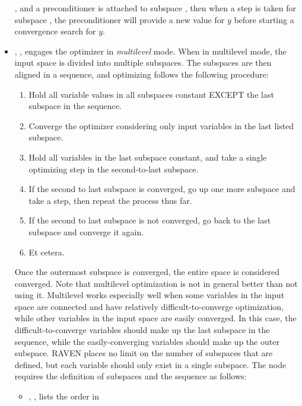 \begin{itemize}
        , and a preconditioner is attached to subspace , then when a step
        is taken for subspace , the preconditioner will provide a new value for $y$ before
        starting a convergence search for $y$.
\item {}, , engages the optimizer in \emph{multilevel}
        mode.  When in multilevel mode, the input space is divided into multiple subspaces.  The subspaces are
        then aligned in a sequence, and optimizing follows the following procedure:
        \begin{enumerate}
          \item Hold all variable values in all subspaces constant EXCEPT the last subspace in the sequence.
          \item Converge the optimizer considering only input variables in the last listed subspace.
          \item Hold all variables in the last subspace constant, and take a single optimizing step in the
            second-to-last subspace.
          \item If the second to last subspace is converged, go up one more subspace and take a step, then
            repeat the process thus far.
          \item If the second to last subspace is not converged, go back to the last subspace and converge it
            again.
          \item Et cetera.
        \end{enumerate}
        Once the outermost subspace is converged, the entire space is considered converged.
        Note that multilevel optimization is not in general better than not using it.  Multilevel works
        especially well when some variables in the input space are connected and have relatively
        difficult-to-converge optimization, while other variables in the input space are easily converged.  In
        this case, the difficult-to-converge variables should make up the last subspace in the sequence, while
        the easily-converging variables should make up the outer subspace.
        RAVEN places no limit on the
        number of subspaces that are defined, but each variable should only exist in a single subspace.
        The  node requires the definition of subspaces and the sequence as follows:
        \begin{itemize}
          \item {}, , lists the order in

\end{itemize}
\end{itemize}
